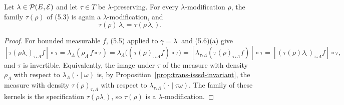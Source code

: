\begin{proposition}[Georgii (5.6)(b)]
    \label{prop:trans-modification}
    \leanok

    Let $\lambda \in \mathcal{P}(E, \mathcal{E})$ and let $\tau \in T$ be $\lambda$-preserving.  For
    every $\lambda$-modification $\rho$, the family $\tau(\rho)$ of (5.3) is again a
    $\lambda$-modification, and
    \[\tau(\rho)\,\lambda_\cdot = \tau(\rho\,\lambda_\cdot).\]
\end{proposition}
\begin{proof}
    \leanok

    For bounded measurable $f$, (5.5) applied to $\gamma = \lambda_\cdot$ and (5.6)(a) give
    \[[\tau(\rho\lambda_\cdot)_{\tau_*\Lambda} f] \circ \tau
      = \lambda_\Lambda(\rho_\Lambda\, f \circ \tau)
      = \lambda_\Lambda\big((\tau(\rho)_{\tau_*\Lambda} f) \circ \tau\big)
      = [\lambda_{\tau_*\Lambda}(\tau(\rho)_{\tau_*\Lambda} f)] \circ \tau
      = [(\tau(\rho)\lambda_\cdot)_{\tau_*\Lambda} f] \circ \tau,\]
    and $\tau$ is invertible.  Equivalently, the image under $\tau$ of the measure with density
    $\rho_\Lambda$ with respect to $\lambda_\Lambda(\cdot\mid\omega)$ is, by
    Proposition~\ref{prop:trans-isssd-invariant}, the measure with density
    $\tau(\rho)_{\tau_*\Lambda}$ with respect to $\lambda_{\tau_*\Lambda}(\cdot\mid\tau\omega)$.
    The family of these kernels is the specification $\tau(\rho\lambda_\cdot)$, so $\tau(\rho)$
    is a $\lambda$-modification.
\end{proof}

